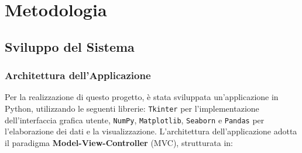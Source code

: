 \section{Metodologia}

\subsection{Sviluppo del Sistema}

\subsubsection{Architettura dell'Applicazione}
Per la realizzazione di questo progetto, è stata sviluppata un'applicazione in Python, utilizzando le seguenti librerie: \texttt{Tkinter} per l'implementazione dell'interfaccia grafica utente, \texttt{NumPy}, \texttt{Matplotlib}, \texttt{Seaborn} e \texttt{Pandas} per l'elaborazione dei dati e la visualizzazione. L'architettura dell'applicazione adotta il paradigma \textbf{Model-View-Controller} (MVC), strutturata in:

